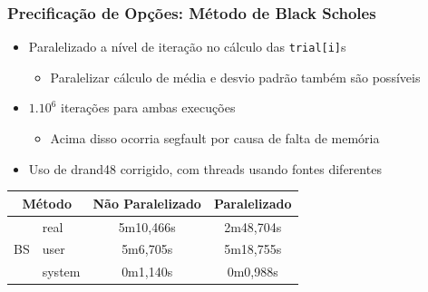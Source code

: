 \documentclass{beamer}
\begin{document}
\begin{frame}

\frametitle{Precificação de Opções: Método de Black Scholes}
	
\begin{itemize}
    \item Paralelizado a nível de iteração no cálculo das \texttt{trial[i]}s
    \begin{itemize}
		\item Paralelizar cálculo de média e desvio padrão também são possíveis
	\end{itemize}
    \item $1.10^6$ iterações para ambas execuções
    \begin{itemize}
		\item Acima disso ocorria segfault por causa de falta de memória
	\end{itemize}
    \item Uso de \textrm{drand48} corrigido, com threads usando fontes diferentes
\end{itemize}

\renewcommand*{\arraystretch}{1.3}
\begin{table}[h]
	\centering
	\begin{tabular}{|r|l|c|c|}
		\hline
		\multicolumn{2}{|c|}{Método}	& Não Paralelizado & Paralelizado \\
		\hline
		\multirow{3}{*}{BS} & real 		& 5m10,466s	& 2m48,704s \\
							& user 		& 5m6,705s	& 5m18,755s \\
							& system	& 0m1,140s	& 0m0,988s \\
		\hline
	\end{tabular}
\end{table}
\renewcommand*{\arraystretch}{1}

\end{frame}

\end{document}
